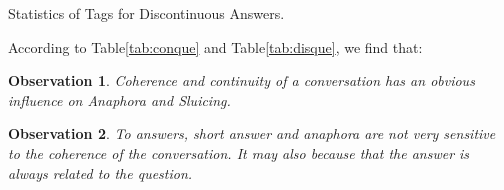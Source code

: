 \documentclass[bsc,frontabs,twoside,singlespacing,parskip,deptreport]{infthesis}     %
\newtheorem*{observation}{Observation}
\begin{document}
\begin{minipage}{\textwidth}
\begin{minipage}[t]{0.45\textwidth}
        \end{minipage}
        \begin{minipage}[t]{0.45\textwidth}
        \centering
        \makeatletter{}\makeatother
{}
\caption{Statistics of Tags for Discontinuous Answers.}
\label{tab:disans}

        \end{minipage}
    \end{minipage}


According to Table\ref{tab:conque} and Table\ref{tab:disque}, we find that:

\begin{observation}
Coherence and continuity of a conversation has an obvious influence on Anaphora and Sluicing.
\end{observation}

\begin{observation}
To answers, short answer and anaphora are not very sensitive to the coherence of the conversation. It may also because that the answer is always related to the question. 
\end{observation}
\end{document}
